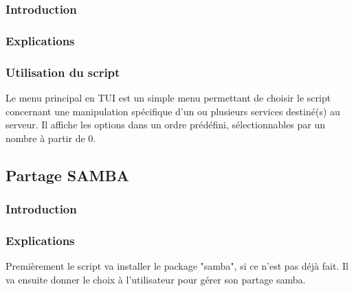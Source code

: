 \documentclass{article}
\begin{document}
	\subsubsection{Introduction}
	\subsubsection{Explications}
	\subsubsection{Utilisation du script}
	Le menu principal en TUI est un simple menu permettant de choisir le script concernant une manipulation spécifique d'un ou plusieurs services destiné(s) au serveur.
	Il affiche les options dans un ordre prédéfini, sélectionnables par un nombre à partir de 0.
	\subsection{Partage SAMBA}
	\subsubsection{Introduction}
	\subsubsection{Explications}

	Premièrement le script va installer le package "samba", si ce n'est pas déjà fait.
	Il va ensuite donner le choix à l'utilisateur pour gérer son partage samba.
	 
\end{document}
